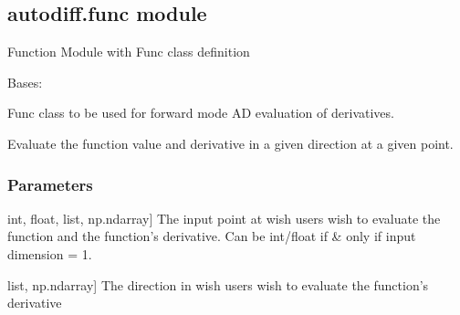 \documentclass[letterpaper,10pt,english]{sphinxmanual}
\begin{document}
\subsection{autodiff.func module}
\label{\detokenize{autodiff:module-autodiff.func}}\label{\detokenize{autodiff:autodiff-func-module}}
\sphinxAtStartPar
Function Module with Func class definition

\begin{fulllineitems}
\label{\detokenize{autodiff:autodiff.func.Func}}
\pysigstartsignatures
{}
\pysigstopsignatures
\sphinxAtStartPar
Bases: 

\sphinxAtStartPar
Func class to be used for forward mode AD evaluation of derivatives.

\begin{fulllineitems}
\label{\detokenize{autodiff:autodiff.func.Func.eval}}
\pysigstartsignatures
{}
\pysigstopsignatures
\sphinxAtStartPar
Evaluate the function value and derivative in a given direction at a given point.


\subsubsection{Parameters}
\label{\detokenize{autodiff:parameters}}\begin{description}
\sphinxlineitem{point}{[}int, float, list, np.ndarray{]}
\sphinxAtStartPar
The input point at wish users wish to evaluate the function and the function’s derivative. Can be int/float if \& only if input dimension = 1.

\sphinxlineitem{seed\_vector}{[}list, np.ndarray{]}
\sphinxAtStartPar
The direction in wish users wish to evaluate the function’s derivative

\end{description}



\end{fulllineitems}
\end{fulllineitems}
\end{document}
